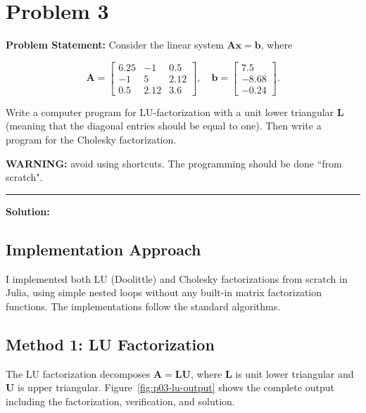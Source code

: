\clearpage
\section*{Problem 3}

\textbf{Problem Statement:} Consider the linear system $\mathbf{Ax} = \mathbf{b}$, where

$$\mathbf{A} = \begin{bmatrix}
6.25 & -1 & 0.5 \\
-1 & 5 & 2.12 \\
0.5 & 2.12 & 3.6
\end{bmatrix}, \quad \mathbf{b} = \begin{bmatrix}
7.5 \\
-8.68 \\
-0.24
\end{bmatrix}.$$

Write a computer program for LU-factorization with a unit lower triangular $\mathbf{L}$ (meaning that the diagonal entries should be equal to one). Then write a program for the Cholesky factorization.

\textbf{WARNING:} avoid using shortcuts. The programming should be done ``from scratch".

\noindent\rule{\textwidth}{0.4pt}

\vspace{1em}

\textbf{Solution:}

\subsection*{Implementation Approach}

I implemented both LU (Doolittle) and Cholesky factorizations from scratch in Julia, using simple nested loops without any built-in matrix factorization functions. The implementations follow the standard algorithms.

\subsection*{Method 1: LU Factorization}

The LU factorization decomposes $\mathbf{A} = \mathbf{LU}$, where $\mathbf{L}$ is unit lower triangular and $\mathbf{U}$ is upper triangular. Figure~\ref{fig:p03-lu-output} shows the complete output including the factorization, verification, and solution.

